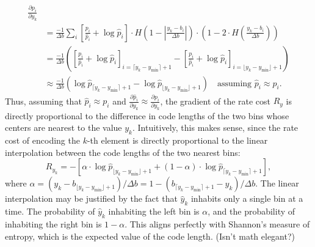 \begin{equation}
\begin{split}
      \frac{\partial p_i}{\partial y_k}
    \\
    &= \frac{-1}{\Delta b} \sum_i
      \left[ \frac{p_i}{\hat{p}_i} + \log \hat{p}_i \right] \cdot
      H{\left( 1 - \left| \frac{y_k - b_i}{\Delta b} \right| \right)} \cdot
      \left( 1 - 2 \cdot H{\left( \frac{y_k - b_i}{\Delta b} \right)} \right)
    \\
    &= \frac{-1}{\Delta b}
      \left(
        \left[ {\frac{p_i}{\hat{p}_i} + \log \hat{p}_i} \right]_{
          i=\lceil{y_k - y_{\mathrm{min}}}\rceil + 1
        }
        -
        \left[ {\frac{p_i}{\hat{p}_i} + \log \hat{p}_i} \right]_{
          i=\lfloor{y_k - y_{\mathrm{min}}}\rfloor + 1
        }
      \right)
    \\
    &\approx \frac{-1}{\Delta b} \left(
      \log \hat{p}_{\lceil{y_k - y_{\mathrm{min}}}\rceil + 1} -
      \log \hat{p}_{\lfloor{y_k - y_{\mathrm{min}}}\rfloor + 1}
    \right)
    \quad \text{assuming } \hat{p}_i \approx p_i.
  \end{split}
\end{equation}
%
Thus, assuming that $\hat{p}_i \approx p_i$ and $\frac{\partial \hat{p}_i}{\partial y_k} \approx \frac{\partial p_i}{\partial y_k}$, the gradient of the rate cost $R_y$ is directly proportional to the difference in code lengths of the two bins whose centers are nearest to the value $y_k$.
Intuitively, this makes sense, since the rate cost of encoding the $k$-th element is directly proportional to the linear interpolation between the code lengths of the two nearest bins:
%
\begin{equation*}
  R_{y_k} =
  -
  \left[
    \alpha \cdot
    \log \hat{p}_{\lfloor{y_k - y_{\mathrm{min}}}\rfloor + 1} +
    (1 - \alpha) \cdot
    \log \hat{p}_{\lceil{y_k - y_{\mathrm{min}}}\rceil + 1}
  \right],
\end{equation*}
%
where $\alpha
= (y_k - b_{\lfloor{y_k - y_{\mathrm{min}}}\rfloor + 1}) / \Delta b
= 1 - (b_{\lceil{y_k - y_{\mathrm{min}}}\rceil + 1} - y_k) / \Delta b$.
The linear interpolation may be justified by the fact that $\hat{y}_k$ inhabits only a single bin at a time.
The probability of $\hat{y}_k$ inhabiting the left bin is $\alpha$, and the probability of inhabiting the right bin is $1 - \alpha$.
This aligns perfectly with Shannon's measure of entropy, which is the expected value of the code length. %
(Isn't math elegant?)


